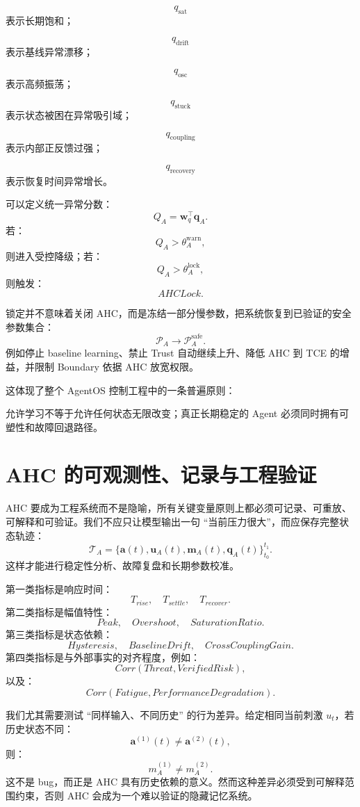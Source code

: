 \[
q_{\mathrm{sat}}
\]
表示长期饱和；

\[
q_{\mathrm{drift}}
\]
表示基线异常漂移；

\[
q_{\mathrm{osc}}
\]
表示高频振荡；

\[
q_{\mathrm{stuck}}
\]
表示状态被困在异常吸引域；

\[
q_{\mathrm{coupling}}
\]
表示内部正反馈过强；

\[
q_{\mathrm{recovery}}
\]
表示恢复时间异常增长。

可以定义统一异常分数：
\[
Q_A
=
\mathbf w_q^\top
\mathbf q_A.
\]
若：
\[
Q_A>\theta_A^{\mathrm{warn}},
\]
则进入受控降级；若：
\[
Q_A>\theta_A^{\mathrm{lock}},
\]
则触发：
\[
AHCLock.
\]

锁定并不意味着关闭 AHC，而是冻结一部分慢参数，把系统恢复到已验证的安全参数集合：
\[
\mathcal P_A
\rightarrow
\mathcal P_A^{\mathrm{safe}}.
\]
例如停止 baseline learning、禁止 Trust 自动继续上升、降低 AHC 到 TCE 的增益，并限制 Boundary 依据 AHC 放宽权限。

这体现了整个 AgentOS 控制工程中的一条普遍原则：
\begin{statementbox}
\centering
{}
\end{statementbox}
允许学习不等于允许任何状态无限改变；真正长期稳定的 Agent 必须同时拥有可塑性和故障回退路径。


\section{AHC 的可观测性、记录与工程验证}

AHC 要成为工程系统而不是隐喻，所有关键变量原则上都必须可记录、可重放、可解释和可验证。我们不应只让模型输出一句 ``当前压力很大''，而应保存完整状态轨迹：
\[
\mathcal T_A
=
\{
\mathbf a(t),
\mathbf u_A(t),
\mathbf m_A(t),
\mathbf q_A(t)
\}_{t_0}^{t_1}.
\]
这样才能进行稳定性分析、故障复盘和长期参数校准。

第一类指标是响应时间：
\[
T_{rise},
\quad
T_{settle},
\quad
T_{recover}.
\]
第二类指标是幅值特性：
\[
Peak,
\quad
Overshoot,
\quad
SaturationRatio.
\]
第三类指标是状态依赖：
\[
Hysteresis,
\quad
BaselineDrift,
\quad
CrossCouplingGain.
\]
第四类指标是与外部事实的对齐程度，例如：
\[
Corr(
Threat,
VerifiedRisk
),
\]
以及：
\[
Corr(
Fatigue,
PerformanceDegradation
).
\]

我们尤其需要测试 ``同样输入、不同历史'' 的行为差异。给定相同当前刺激 $u_t$，若历史状态不同：
\[
\mathbf a^{(1)}(t)
\neq
\mathbf a^{(2)}(t),
\]
则：
\[
m_A^{(1)}
\neq
m_A^{(2)}.
\]
这不是 bug，而正是 AHC 具有历史依赖的意义。然而这种差异必须受到可解释范围约束，否则 AHC 会成为一个难以验证的隐藏记忆系统。

